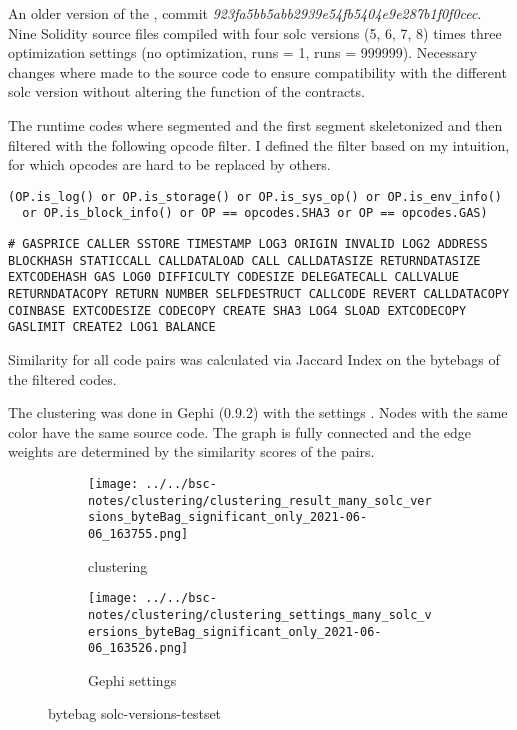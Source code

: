 \documentclass[../main.tex]{subfiles}
\begin{document}
An older version of the , commit \textit{923fa5bb5abb2939e54fb5404e9e287b1f0f0cec}.
Nine Solidity source files compiled with four solc versions (5, 6, 7, 8) times three optimization
settings (no optimization, runs = 1, runs = 999999).
Necessary changes where made to the source code to ensure compatibility with the different solc
version without altering the function of the contracts.

The runtime codes where segmented and the first segment skeletonized and then filtered with the following opcode filter. I defined the filter based on my intuition, for which opcodes are hard to be replaced by others.
\begin{lstlisting}[style=pymd]
(OP.is_log() or OP.is_storage() or OP.is_sys_op() or OP.is_env_info()
  or OP.is_block_info() or OP == opcodes.SHA3 or OP == opcodes.GAS)
\end{lstlisting}
\begin{lstlisting}[style=pysm]
# GASPRICE CALLER SSTORE TIMESTAMP LOG3 ORIGIN INVALID LOG2 ADDRESS BLOCKHASH STATICCALL CALLDATALOAD CALL CALLDATASIZE RETURNDATASIZE EXTCODEHASH GAS LOG0 DIFFICULTY CODESIZE DELEGATECALL CALLVALUE RETURNDATACOPY RETURN NUMBER SELFDESTRUCT CALLCODE REVERT CALLDATACOPY COINBASE EXTCODESIZE CODECOPY CREATE SHA3 LOG4 SLOAD EXTCODECOPY GASLIMIT CREATE2 LOG1 BALANCE
\end{lstlisting}

Similarity for all code pairs was calculated via Jaccard Index on the bytebags of the filtered codes.

The clustering  was done in Gephi (0.9.2) with the settings .
Nodes with the same color have the same source code.
The graph is fully connected and the edge weights are determined by the similarity scores of the pairs.

\begin{figure}[ht!]
  \begin{subfigure}[c]{.6\linewidth}
    \texttt{[image: ../../bsc-notes/clustering/clustering\_result\_many\_solc\_versions\_byteBag\_significant\_only\_2021-06-06\_163755.png]}
    \caption{clustering}
    \label{fig:solc_bytebag_cluster}
  \end{subfigure}%
  \begin{subfigure}[c]{.4\linewidth}
    \texttt{[image: ../../bsc-notes/clustering/clustering\_settings\_many\_solc\_versions\_byteBag\_significant\_only\_2021-06-06\_163526.png]}
    \caption{Gephi settings}
    \label{fig:solc_bytebag_cluster_settings}
  \end{subfigure}
  \caption{bytebag solc-versions-testset}
\end{figure}
\end{document}
